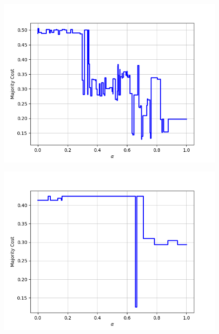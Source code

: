 \begin{figure}[h]
\begin{minipage}{.24\textwidth}
  {\includegraphics[width=\linewidth]{plots/nell-ac/vertebrate}}
\end{minipage}
\begin{minipage}{.24\textwidth}
  \centering
  {\includegraphics[width=\linewidth]{plots/nell-ac/visualizableattribute}}
\end{minipage}
\begin{minipage}{.24\textwidth}
  \centering

\end{minipage}
\end{figure}
